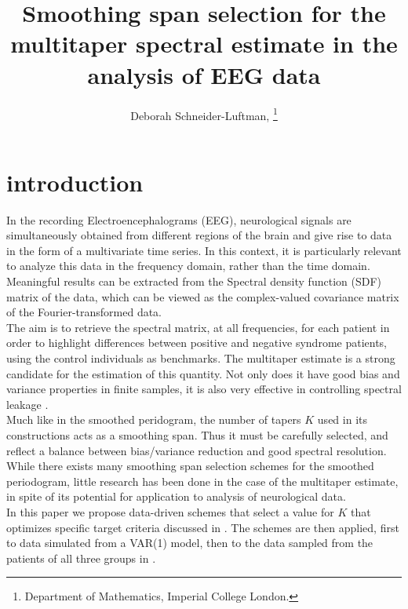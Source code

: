 \documentclass[9pt,journal]{IEEEtran}
\numberwithin{equation}{section}
\begin{document}
\title{Smoothing span selection for the multitaper spectral estimate in the analysis of EEG data}
\author{Deborah Schneider-Luftman, 
\thanks{ Department of Mathematics, Imperial College London.}}
%
{ }
\maketitle

\section{introduction}
In the recording  Electroencephalograms (EEG), neurological signals are simultaneously
obtained from different regions of the brain and give rise to data in the form of a multivariate
time series. In this context, it is particularly relevant to analyze this data in the frequency domain, rather than the time domain. Meaningful results can be extracted from the Spectral density function (SDF) matrix of the data, which can be viewed as the complex-valued covariance matrix of the Fourier-transformed data.\\
The aim is to retrieve the spectral matrix, at all frequencies, for each patient in order to highlight differences between positive and negative syndrome patients, using the control individuals as benchmarks. The multitaper estimate is a strong candidate for the estimation of this quantity.  Not only does it have good bias and variance properties in finite samples, it is also very effective in controlling spectral leakage \cite{Percival1993}. \\
Much like in the smoothed peridogram, the number of tapers $K$ used in its constructions acts as a smoothing span. Thus it must be carefully selected, and reflect a balance between bias/variance reduction and good spectral resolution.\\
While there exists many smoothing span selection schemes for the smoothed periodogram, little research has been done in the case of the multitaper estimate, in spite of its potential for application to analysis of neurological data.\\
In this paper we propose data-driven schemes that select a value for $K$ that optimizes specific target criteria discussed in . The schemes are then applied, first to data simulated from a VAR(1) model, then to the data sampled from the patients of all three groups in .
\end{document}
